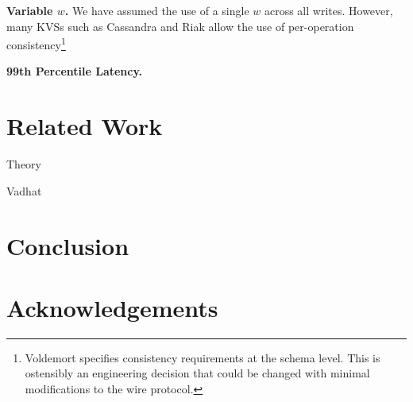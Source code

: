 \documentclass{vldb}
\begin{document}
\textbf{Variable $w$.} We have assumed the use of a single $w$ across
all writes.  However, many KVSs such as Cassandra and Riak allow the
use of per-operation consistency\footnote{Voldemort specifies
  consistency requirements at the schema level. This is ostensibly an
  engineering decision that could be changed with minimal
  modifications to the wire protocol.}

\textbf{99th Percentile Latency.}


\section{Related Work}

Theory

Vadhat

\section{Conclusion}

\section*{Acknowledgements}

\balance



\end{document}
